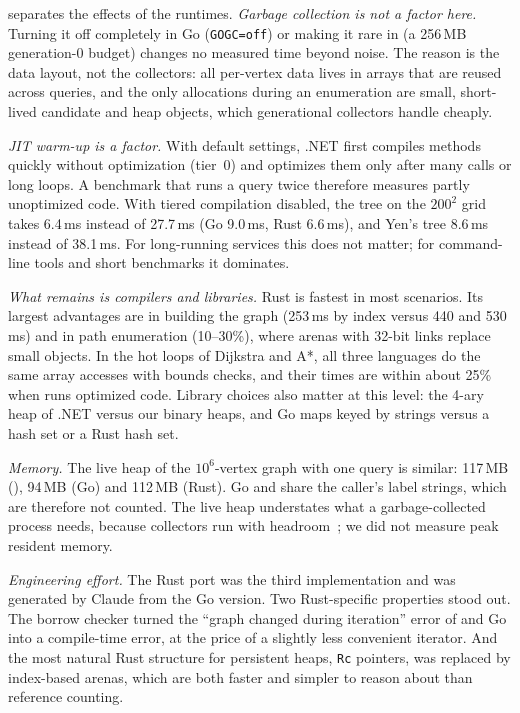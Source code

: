 

 separates the effects of the runtimes. \emph{Garbage collection is not a factor here.} Turning it
off completely in Go (\texttt{GOGC=off}) or making it rare in \cs{} (a 256\,MB generation-0 budget) changes no
measured time beyond noise. The reason is the data layout, not the collectors: all per-vertex data lives in arrays
that are reused across queries, and the only allocations during an enumeration are small, short-lived candidate and
heap objects, which generational collectors handle cheaply.

\emph{JIT warm-up is a factor.} With default settings, .NET first compiles methods quickly without optimization
(tier~0) and optimizes them only after many calls or long loops. A benchmark that runs a query twice therefore
measures partly unoptimized code. With tiered compilation disabled, the \cs{} tree on the $200^2$ grid takes 6.4\,ms
instead of 27.7\,ms (Go 9.0\,ms, Rust 6.6\,ms), and Yen's tree 8.6\,ms instead of 38.1\,ms. For long-running
services this does not matter; for command-line tools and short benchmarks it dominates.

\emph{What remains is compilers and libraries.} Rust is fastest in most scenarios. Its largest advantages are in
building the graph (253\,ms by index versus 440 and 530\,ms) and in path enumeration (10--30\%), where arenas with
32-bit links replace small objects. In the hot loops of Dijkstra and A*, all three languages do the same array
accesses with bounds checks, and their times are within about 25\% when \cs{} runs optimized code. Library choices
also matter at this level: the 4-ary heap of .NET versus our binary heaps, and Go maps keyed by strings versus a
\cs{} hash set or a Rust hash set.

\emph{Memory.} The live heap of the $10^6$-vertex graph with one query is similar: 117\,MB (\cs), 94\,MB (Go) and
112\,MB (Rust). Go and \cs{} share the caller's label strings, which are therefore not counted. The live heap
understates what a garbage-collected process needs, because collectors run with headroom~\cite{hertz2005}; we did
not measure peak resident memory.

\emph{Engineering effort.} The Rust port was the third implementation and was generated by Claude from the Go
version. Two Rust-specific properties stood out. The borrow checker turned the ``graph changed during iteration''
error of \cs{} and Go into a compile-time error, at the price of a slightly less convenient iterator. And the most
natural Rust structure for persistent heaps, \texttt{Rc} pointers, was replaced by index-based arenas, which are
both faster and simpler to reason about than reference counting.
